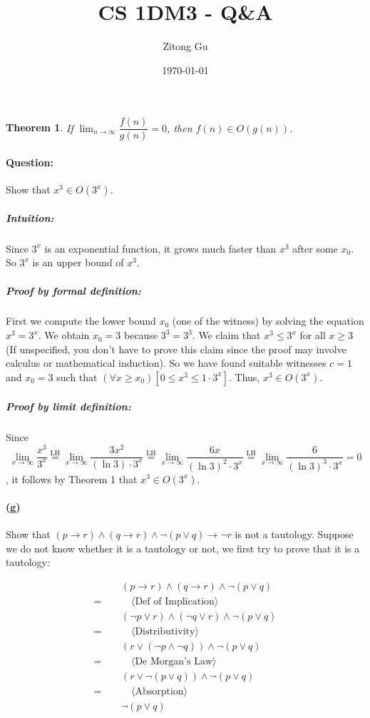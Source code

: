 \documentclass[a4paper]{article}
\title{CS 1DM3 - Q\&A}
\author{Zitong Gu}
\date{\today}
\newcommand{\hint}[1]{=\, &\quad\quad \langle #1 \rangle}
\newcommand{\state}[1]{&\quad #1}
\renewcommand{\implies}{\rightarrow}
\newtheorem{theorem}{Theorem}
\begin{document}
\maketitle

\begin{theorem} If $\lim_{n \to \infty} \dfrac{f(n)}{g(n)} = 0$, then $f(n) \in O(g(n))$. \end{theorem}

\paragraph{Question:} Show that $x^3 \in O(3^x)$. 

\subparagraph{Intuition:} Since $3^x$ is an exponential function, it grows much faster than $x^3$ after some $x_0$. So $3^x$ is an upper bound of $x^3$. 

\subparagraph{Proof by formal definition:} First we compute the lower bound $x_0$ (one of the witness) by solving the equation $x^3 = 3^x$. We obtain $x_0 = 3$ because $3^3 = 3^3$. We claim that $x^3 \leq 3^x$ for all $x \geq 3$ (If unspecified, you don't have to prove this claim since the proof may involve calculus or mathematical induction). So we have found suitable witnesses $c = 1$ and $x_0 = 3$ such that $(\forall x \geq x_0)[0 \leq x^3 \leq 1 \cdot 3^x]$. Thus, $x^3 \in O(3^x)$. 

\subparagraph{Proof by limit definition:} Since \begin{equation*}
    \lim_{x \to \infty} \dfrac{x^3}{3^x} \overset{\mathrm{LH}}{=} \lim_{x \to \infty} \dfrac{3x^2}{(\ln{3}) \cdot 3^x} \overset{\mathrm{LH}}{=} \lim_{x \to \infty} \dfrac{6x}{(\ln{3})^2 \cdot 3^x} \overset{\mathrm{LH}}{=} \lim_{x \to \infty} \dfrac{6}{(\ln{3})^3 \cdot 3^x} = 0
\end{equation*}, it follows by Theorem 1 that $x^3 \in O(3^x)$. 

\paragraph{(g)} Show that $(p \implies r) \wedge (q \implies r) \wedge \neg (p \vee q) \implies \neg r$ is not a tautology. Suppose we do not know whether it is a tautology or not, we first try to prove that it is a tautology:

\begin{align*}
    \state{(p \implies r) \wedge (q \implies r) \wedge \neg (p \vee q)} \\
    \hint{\text{Def of Implication}} \\
    \state{(\neg p \vee r) \wedge (\neg q \vee r) \wedge \neg (p \vee q)} \\
    \hint{\text{Distributivity}} \\
    \state{(r \vee (\neg p \wedge \neg q)) \wedge \neg (p \vee q)} \\
    \hint{\text{De Morgan's Law}} \\
    \state{(r \vee \neg (p \vee q)) \wedge \neg (p \vee q)} \\
    \hint{\text{Absorption}} \\
    \state{\neg (p \vee q)}
\end{align*}
\end{document}
